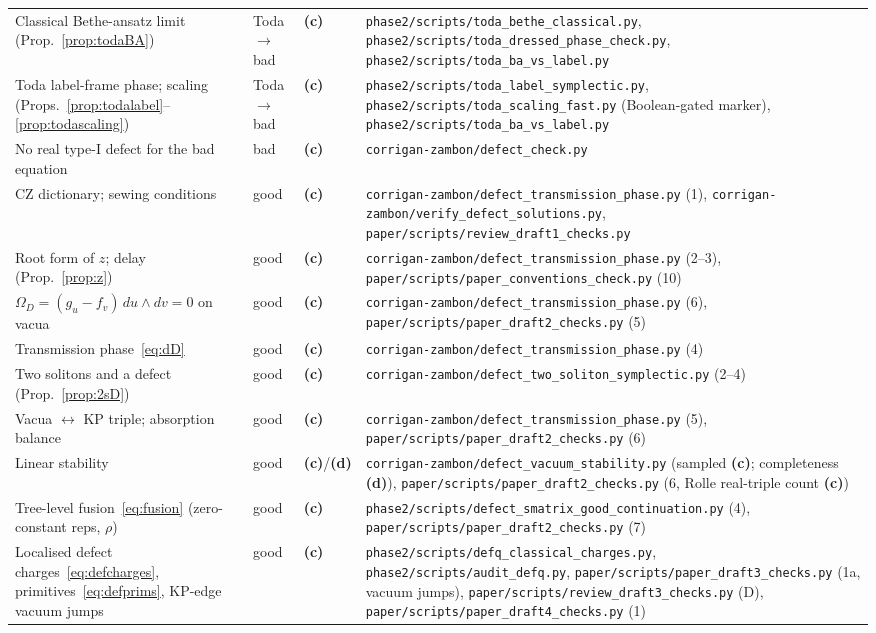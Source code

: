 \documentclass[11pt,a4paper]{article}
\newcommand{\lab}[1]{{\normalfont\sffamily\footnotesize\bfseries(#1)}}
\newcommand{\Lc}{\lab{c}}
\newcommand{\Ld}{\lab{d}}
\newcommand{\scr}[1]{\nolinkurl{#1}}
\theoremstyle{remark}
\begin{document}
\begin{longtable}{@{}>{\raggedright}p{5.4cm}>{\raggedright}p{1.3cm}>{\raggedright}p{0.75cm}>{\raggedright\arraybackslash}p{6.55cm}@{}}
Classical Bethe-ansatz limit (Prop.~\ref{prop:todaBA}) & Toda$\to$bad & \Lc & \scr{phase2/scripts/toda_bethe_classical.py}, \scr{phase2/scripts/toda_dressed_phase_check.py}, \scr{phase2/scripts/toda_ba_vs_label.py}\\
Toda label-frame phase; scaling (Props.~\ref{prop:todalabel}--\ref{prop:todascaling}) & Toda$\to$bad & \Lc & \scr{phase2/scripts/toda_label_symplectic.py}, \scr{phase2/scripts/toda_scaling_fast.py} (Boolean-gated marker), \scr{phase2/scripts/toda_ba_vs_label.py}\\
No real type-I defect for the bad equation & bad & \Lc & \scr{corrigan-zambon/defect_check.py}\\
CZ dictionary; sewing conditions & good & \Lc & \scr{corrigan-zambon/defect_transmission_phase.py} (1), \scr{corrigan-zambon/verify_defect_solutions.py}, \scr{paper/scripts/review_draft1_checks.py}\\
Root form of $z$; delay (Prop.~\ref{prop:z}) & good & \Lc & \scr{corrigan-zambon/defect_transmission_phase.py} (2--3), \scr{paper/scripts/paper_conventions_check.py} (10)\\
$\Omega_D=(g_u-f_v)\,du\wedge dv=0$ on vacua & good & \Lc & \scr{corrigan-zambon/defect_transmission_phase.py} (6), \scr{paper/scripts/paper_draft2_checks.py} (5)\\
Transmission phase~\eqref{eq:dD} & good & \Lc & \scr{corrigan-zambon/defect_transmission_phase.py} (4)\\
Two solitons and a defect (Prop.~\ref{prop:2sD}) & good & \Lc & \scr{corrigan-zambon/defect_two_soliton_symplectic.py} (2--4)\\
Vacua $\leftrightarrow$ KP triple; absorption balance & good & \Lc & \scr{corrigan-zambon/defect_transmission_phase.py} (5), \scr{paper/scripts/paper_draft2_checks.py} (6)\\
Linear stability & good & \Lc/\Ld & \scr{corrigan-zambon/defect_vacuum_stability.py} (sampled \Lc; completeness \Ld), \scr{paper/scripts/paper_draft2_checks.py} (6, Rolle real-triple count \Lc)\\
Tree-level fusion~\eqref{eq:fusion} (zero-constant reps, $\rho$) & good & \Lc & \scr{phase2/scripts/defect_smatrix_good_continuation.py} (4), \scr{paper/scripts/paper_draft2_checks.py} (7)\\
Localised defect charges~\eqref{eq:defcharges}, primitives~\eqref{eq:defprims}, KP-edge vacuum jumps & good & \Lc & \scr{phase2/scripts/defq_classical_charges.py}, \scr{phase2/scripts/audit_defq.py}, \scr{paper/scripts/paper_draft3_checks.py} (1a, vacuum jumps), \nolinkurl{paper/scripts/review_draft3_checks.py} (D), \nolinkurl{paper/scripts/paper_draft4_checks.py} (1)\\

\end{longtable}
\end{document}

